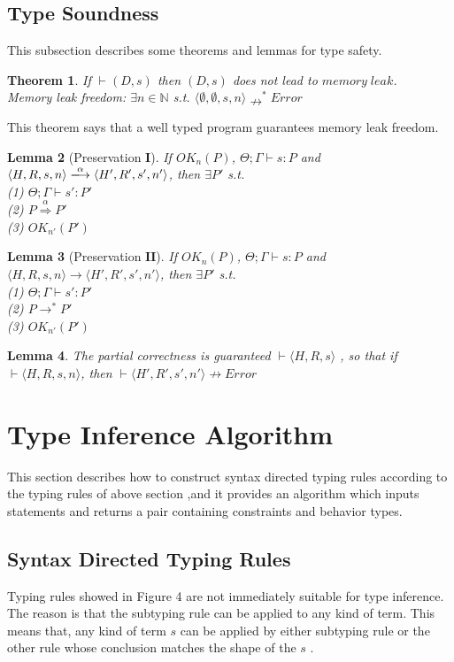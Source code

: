 \documentclass[english]{jssst_ppl} %
\newtheorem{theorem}{Theorem}[section]
\newtheorem{lemma}[theorem]{Lemma}
\begin{document}
\subsection{Type Soundness}
This subsection describes some theorems and lemmas for type safety.
\begin{theorem}\label{thm1}
If $\vdash (D, s)$ then $(D, s)$ does not lead to $memory\;leak$.\\
Memory leak freedom: $\exists n \in \mathbb{N}$ s.t.
$\langle \emptyset, \emptyset, s, n \rangle \nrightarrow^{*}Error$
\end{theorem}
\noindent
This theorem says that a well typed program guarantees memory leak freedom.
\begin{lemma}[Preservation $\mathbf{I}$]%
If $OK_{n}(P)$, $\Theta; \Gamma \vdash s : P$ and $\langle H,R,s, n \rangle
\xlongrightarrow{\alpha}\langle H',R',s', n'
\rangle$, then $\exists P'$ s.t. \\
(1) $ \Theta; \Gamma \vdash s' : P' $ \\
(2) $ P \overset{\text{$\alpha$}}{\Longrightarrow} P'$\\
(3) $ OK_{n'}(P') $
\end{lemma}
\begin{lemma}[Preservation $\mathbf{II}$]%
If $OK_{n}(P)$, $\Theta ; \Gamma \vdash s : P$ and $\langle H,R,s,n \rangle
\rightarrow \langle H',R',s', n'
\rangle$, then $\exists P'$ s.t. \\
(1) $\Theta; \Gamma \vdash s' : P'$\\
(2) $ P \rightarrow^{*} P'  $\\
(3) $OK_{n'}(P')$
\end{lemma}
\begin{lemma}%
 The partial correctness is guaranteed $\vdash \langle H,R,s \rangle$ , so that if $\vdash \langle H,R,s,n \rangle$, then $\vdash \langle H',R',s',n' \rangle \nrightarrow Error$
\end{lemma}
\section{Type Inference Algorithm}
This section describes how to construct syntax directed typing rules according to the typing rules of above section ,and it provides an algorithm which inputs statements and returns a pair containing constraints and behavior types.
\subsection{Syntax Directed Typing Rules}
Typing rules showed in Figure 4 are not immediately suitable for type inference. The reason is that the subtyping rule can be applied to any kind of term. This means that, any kind of term $s$ can be applied by either subtyping rule or the other rule whose conclusion matches the shape of the $s$ \cite{plain:book1}.
\end{document}
